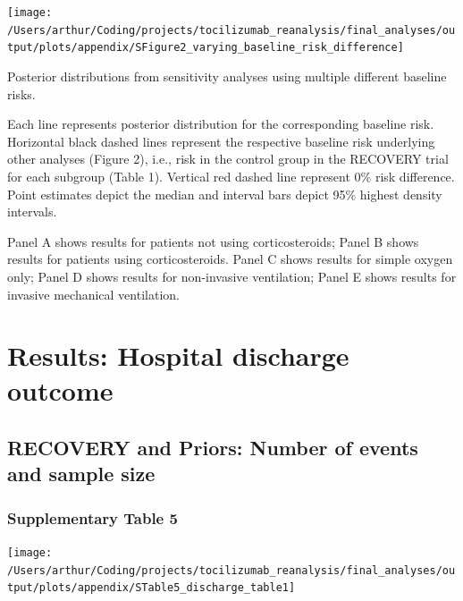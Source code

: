 \documentclass[
]{article}
\begin{document}
\begin{center}\texttt{[image: /Users/arthur/Coding/projects/tocilizumab\_reanalysis/final\_analyses/output/plots/appendix/SFigure2\_varying\_baseline\_risk\_difference]} \end{center}

Posterior distributions from sensitivity analyses using multiple
different baseline risks.

Each line represents posterior distribution for the corresponding
baseline risk. Horizontal black dashed lines represent the respective
baseline risk underlying other analyses (Figure 2), i.e., risk in the
control group in the RECOVERY trial for each subgroup (Table 1).
Vertical red dashed line represent 0\% risk difference. Point estimates
depict the median and interval bars depict 95\% highest density
intervals.

Panel A shows results for patients not using corticosteroids; Panel B
shows results for patients using corticosteroids. Panel C shows results
for simple oxygen only; Panel D shows results for non-invasive
ventilation; Panel E shows results for invasive mechanical ventilation.

\newpage

\hypertarget{results-hospital-discharge-outcome}{%
\section{Results: Hospital discharge
outcome}\label{results-hospital-discharge-outcome}}

\hypertarget{recovery-and-priors-number-of-events-and-sample-size}{%
\subsection{RECOVERY and Priors: Number of events and sample
size}\label{recovery-and-priors-number-of-events-and-sample-size}}

\hypertarget{supplementary-table-5}{%
\subsubsection{Supplementary Table 5}\label{supplementary-table-5}}

\begin{center}\texttt{[image: /Users/arthur/Coding/projects/tocilizumab\_reanalysis/final\_analyses/output/plots/appendix/STable5\_discharge\_table1]} \end{center}

\newpage
\end{document}
